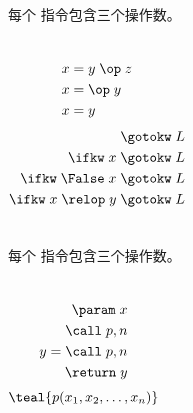 
\begin{frame}{}
  \begin{center}
    \begin{definition}
      每个  指令包含三个操作数。
    \end{definition}

    \vspace{0.80cm}
    \begin{columns}
        \begin{align}
          x &= y \;\op\; z \\
          x &= \op\; y \\
          x &= y
        \end{align}
        \pause
        \begin{align}
          \gotokw\; L \\
          \ifkw\; x \;\gotokw\; L \\
          \ifkw\; \False\; x \;\gotokw\; L \\
          \ifkw\; x \;\relop\; y \;\gotokw\; L
        \end{align}
    \end{columns}
  \end{center}
\end{frame}

\begin{frame}{}
  \begin{center}
    \begin{definition}
      每个  指令包含三个操作数。
    \end{definition}

    \vspace{0.80cm}
    \begin{columns}
        \begin{align}
          \param\; x \\
          \call\; p, n \\
          y = \call\; p, n \\
          \return\; y
        \end{align}
        \[
          \teal{p(x_{1}, x_{2}, \dots, x_{n})}
        \]
    \end{columns}
  \end{center}
\end{frame}

